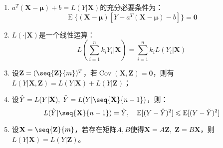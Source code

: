\begin{property}
\begin{enumerate}
		\item
		$a^T(\mathbf{X}-\boldsymbol{\mu})+b=L(Y|\mathbf{X})$的充分必要条件为：
		\begin{equation*}
			\operatorname{E}\{(\mathbf{X}-\boldsymbol{\mu})[Y-a^T(\mathbf{X}-\boldsymbol{\mu})-b]\}=\mathbf{0}
		\end{equation*}
		\item $L(\cdot|\mathbf{X})$是一个线性运算：
		\begin{equation*}
			L\left(\sum_{i=1}^{n}k_iY_i|\mathbf{X}\right)=\sum_{i=1}^{n}k_iL(Y_i|\mathbf{X})
		\end{equation*}
		\item 设$\mathbf{Z}=(\seq{\mathbf{Z}}{m})^T$，若$\operatorname{Cov}(\mathbf{X},\mathbf{Z})=\mathbf{0}$，则有$L(Y|\mathbf{X},\mathbf{Z})=L(Y|\mathbf{X})+L(Y|\mathbf{Z})$；
		\item 设$\hat{Y}=L(Y|\mathbf{X}),\;\tilde{Y}=L(Y|\seq{\mathbf{X}}{n-1})$，则：
		\begin{equation*}
			L(\hat{Y}|\seq{\mathbf{X}}{n-1})=\tilde{Y},\quad\operatorname{E}[(Y-\hat{Y})^2]\leqslant\operatorname{E}[(Y-\tilde{Y})^2]
		\end{equation*}
		\item 设$\mathbf{X}=\seq{\mathbf{Z}}{m}$，若存在矩阵$A,B$使得$\mathbf{X}=A\mathbf{Z},\;\mathbf{Z}=B\mathbf{X}$，则$L(Y|\mathbf{X})=L(Y|\mathbf{Z})$。
	\end{enumerate}
\end{property}
